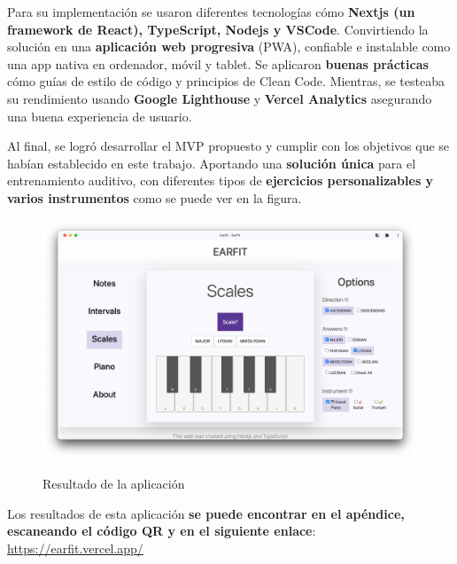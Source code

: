 \documentclass[12pt,twoside,titlepage]{report}
\begin{document}
{Para su implementación se usaron diferentes tecnologías cómo \textbf{Nextjs (un framework de React), TypeScript, Nodejs y VSCode}. Convirtiendo la solución en una \textbf{aplicación web progresiva} (PWA), confiable e instalable como una app nativa en ordenador, móvil y tablet. Se aplicaron \textbf{buenas prácticas} cómo guías de estilo de código y principios de Clean Code. Mientras, se testeaba su rendimiento usando \textbf{Google Lighthouse} y \textbf{Vercel Analytics} asegurando una buena experiencia de usuario.

Al final, se logró desarrollar el MVP propuesto y cumplir con los objetivos que se habían establecido en este trabajo. Aportando una \textbf{solución única} para el entrenamiento auditivo, con diferentes tipos de \textbf{ejercicios personalizables y varios instrumentos} como se puede ver en la figura. 

\begin{figure}[H]
    \centering
    \includegraphics[scale=0.28]{Capturas Earfit/PC/Scales}
    \label{fig:PCScales1}
    \caption{Resultado de la aplicación}
\end{figure}

Los resultados de esta aplicación \textbf{se puede encontrar en el apéndice, escaneando el código QR y en el siguiente enlace}: \url{https://earfit.vercel.app/}

}
\end{document}

